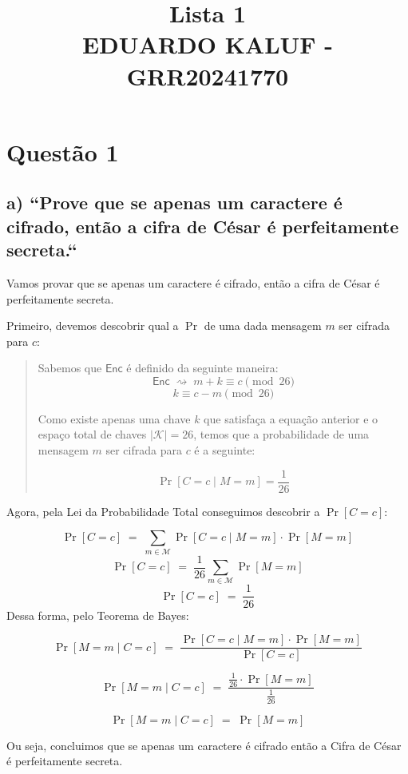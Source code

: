 \documentclass[11pt,a4paper]{article}
\title{Lista 1 \\ EDUARDO KALUF - GRR20241770}
\author{}
\date{}
\newcommand{\Enc}{\mathsf{Enc}}
\begin{document}
\maketitle

\section*{Questão 1}

\subsection*{a) ``Prove que se apenas um caractere é cifrado, então a cifra de César é perfeitamente secreta.``}

Vamos provar que se apenas um caractere é cifrado, então a cifra de César é perfeitamente secreta.

Primeiro, devemos descobrir qual a $\Pr$ de uma dada mensagem $m$ ser cifrada para $c$:

\begin{quote}
    Sabemos que ${\mathsf{Enc}}$ é definido da seguinte maneira:
    \[
    \Enc \;\rightsquigarrow\; m + k \equiv c \pmod{26}
    \]
    \[
    k \equiv c - m \pmod{26}
    \]

    Como existe apenas uma chave $k$ que satisfaça a equação anterior e o espaço total de chaves $|\mathcal{K}| = 26$, temos que a
    probabilidade de uma mensagem $m$ ser cifrada para $c$ é a seguinte:

    \[
    \Pr[C=c \mid M=m] = \frac{1}{26}
    \]
\end{quote}

Agora, pela Lei da Probabilidade Total conseguimos descobrir a ${\Pr[C=c]}$:

\[
\Pr[C=c] \;=\; \sum_{m \in \mathcal{M}} \Pr[C=c \mid M=m]\cdot \Pr[M=m]
\]
\[
\Pr[C=c] \;=\; \frac{1}{26}\sum_{m \in \mathcal{M}} \Pr[M=m]
\]
\[
\Pr[C=c] \;=\; \frac{1}{26}
\]
Dessa forma, pelo Teorema de Bayes:

\[
    \Pr[M=m \mid C=c] \;=\; \frac{\Pr[C=c \mid M=m]\cdot \Pr[M=m]}{\Pr[C=c]}
\]

\[
\Pr[M=m \mid C=c] \;=\; \frac{\frac{1}{26}\cdot \Pr[M=m]}{\frac{1}{26}}
\]

\[
\Pr[M=m \mid C=c] \;=\; \Pr[M=m]
\]

Ou seja, concluimos que se apenas um caractere é cifrado então a Cifra de César é perfeitamente secreta.
\end{document}
